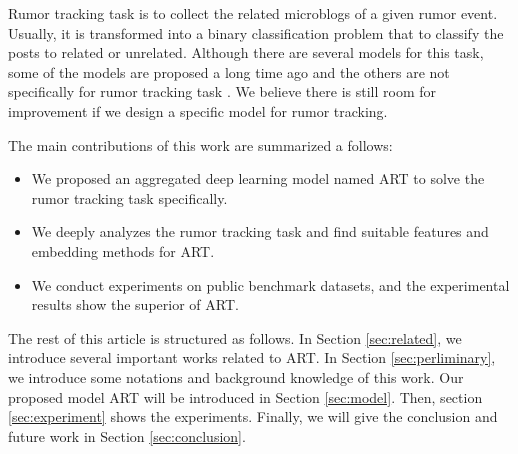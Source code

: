Rumor tracking task is to collect the related microblogs of a given rumor event. Usually, it is transformed into a binary classification problem that to classify the posts to related or unrelated. Although there are several models for this task, some of the models are proposed a long time ago \cite{DBLP:conf/emnlp/QazvinianRRM11} and the others are not specifically for rumor tracking task \cite{DBLP:conf/www/ChengNB20}.
We believe there is still room for improvement if we design a specific model for rumor tracking. 

The main contributions of this work are summarized a follows:
\begin{itemize}
	\item We proposed an aggregated deep learning model named ART to solve the rumor tracking task specifically.
	\item We deeply analyzes the rumor tracking task and find suitable features and embedding methods for ART.
	\item We conduct experiments on public benchmark datasets, and the experimental results show the superior of ART.
\end{itemize}

The rest of this article is structured as follows. In Section \ref{sec:related}, we introduce several important works related to ART. In Section \ref{sec:perliminary}, we introduce some notations and background knowledge of this work. Our proposed model ART will be introduced in Section \ref{sec:model}. Then, section \ref{sec:experiment} shows the experiments. Finally, we will give the conclusion and future work in Section \ref{sec:conclusion}.